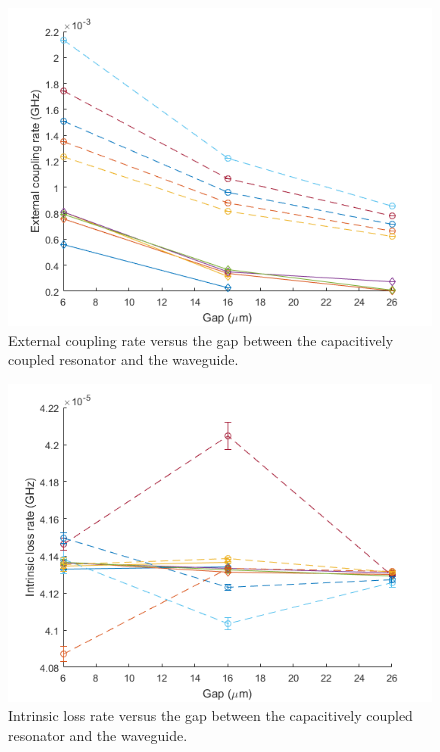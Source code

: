 \documentclass[noshowpacs,amsmath,
superscriptaddress,
10pt]{article}
\begin{document}
\begin{figure}[!ht]
\centering
\includegraphics[width=12cm] {tCap_ke}
\caption{External coupling rate versus the gap between the capacitively coupled resonator and the waveguide.}
\label{pic:tCap_ke}
\end{figure}

\begin{figure}[!ht]
\centering
\includegraphics[width=12cm] {tCap_ki}
\caption{Intrinsic loss rate versus the gap between the capacitively coupled resonator and the waveguide.}
\label{pic:tCap_ki}
\end{figure}
\end{document}
